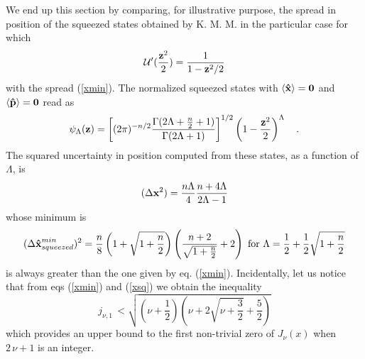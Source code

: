 \documentclass[a4paper,10pt]{article}
\newcommand{\x}{\mbox{\rm{\bf \^ x}}}
\newcommand{\p}{\mbox{\rm{\bf \^ p}}}
\newcommand{\cU}{{\cal U}}
\newcommand{\KMM}{K. M. M. }
\begin{document}
We end up this section by comparing, for illustrative purpose, the
spread in position of the squeezed states obtained by \KMM in the
particular case for which
\begin{equation}
{\cU}' (\frac{{\bf z}^2}{2}) = \frac{1}{1-{\bf z}^2/2}
\end{equation}
with the spread (\ref{xmin}). The normalized squeezed states with
$\langle\x\rangle = {\bf 0}$ and $\langle\p\rangle = {\bf 0}$ read
as
\begin{equation}
\psi_{\Lambda} ({\bf z}) = \left[(2 \pi)^{-n/2} \frac{\Gamma(2
\Lambda + \frac{n}{2} +1)}{\Gamma(2 \Lambda + 1)}\right]^{1/2}
\left(1- \frac{{\bf z}^2}{2}\right)^{\Lambda} \quad .
\end{equation}
The squared uncertainty in position computed from these states, as
a function of $\Lambda$, is
\begin{equation}
(\Delta {\bf x}^2) = \frac{n \Lambda}{4} \frac{n + 4 \Lambda}{2
\Lambda -1}
\end{equation}
whose minimum is
\begin{equation}
(\Delta \x^{min}_{squeezed})^2 =\frac{n}{8} \left(1 + \sqrt{1 +
\frac{n}{2}}\right) \left(\frac{n+2}{\sqrt{1 + \frac{n}{2}}} + 2
\right) \,\, \mbox{for} \,\, \Lambda = \frac{1}{2} +
\frac{1}{2}\sqrt{1 + \frac{n}{2}} \label{xsq}
\end{equation}
is always greater than the one given by eq. (\ref{xmin}).
Incidentally, let us notice that from eqs (\ref{xmin}) and
(\ref{xsq}) we obtain the inequality
\begin{equation} \label{maJ}
j_{\nu,1}\,< \sqrt{\left(\nu+\frac12\right)\left(\nu+2\sqrt{\nu +
\frac 32}+\frac 52\right)}
\end{equation}
which provides an upper bound to the first non-trivial zero of
$J_{\nu} (x)$ when $2\,\nu +1$ is an integer.
\end{document}
